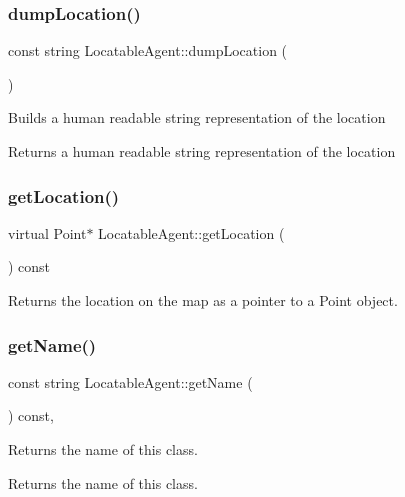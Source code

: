 \subsubsection{\texorpdfstring{dumpLocation()}{dumpLocation()}}
{\footnotesize\ttfamily const string Locatable\+Agent\+::dump\+Location (\begin{DoxyParamCaption}{ }\end{DoxyParamCaption})}

Builds a human readable string representation of the location \begin{DoxyReturn}{Returns}
a human readable string representation of the location 
\end{DoxyReturn}
\mbox{\label{class_locatable_agent_ad779af171c67ce0d478fc79b904e2d90}} 
\subsubsection{\texorpdfstring{getLocation()}{getLocation()}}
{\footnotesize\ttfamily virtual Point$\ast$ Locatable\+Agent\+::get\+Location (\begin{DoxyParamCaption}{ }\end{DoxyParamCaption}) const\hspace{0.3cm}{\ttfamily [virtual]}}

\begin{DoxyReturn}{Returns}
the location on the map as a pointer to a Point object. 
\end{DoxyReturn}
\mbox{\label{class_locatable_agent_a754105958bb672744b525538f1584a7b}} 
\subsubsection{\texorpdfstring{getName()}{getName()}}
{\footnotesize\ttfamily const string Locatable\+Agent\+::get\+Name (\begin{DoxyParamCaption}{ }\end{DoxyParamCaption}) const\hspace{0.3cm}{\ttfamily [override]}, {\ttfamily [virtual]}}

Returns the name of this class. \begin{DoxyReturn}{Returns}
the name of this class. 
\end{DoxyReturn}


